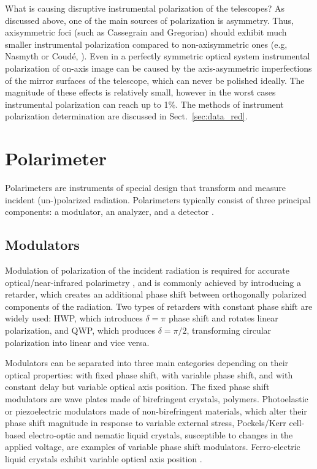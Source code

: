 What is causing disruptive instrumental polarization of the telescopes? 
As discussed above, one of the main sources of polarization is asymmetry.
Thus, axisymmetric foci (such as Cassegrain and Gregorian) should exhibit much smaller instrumental polarization compared to non-axisymmetric ones (e.g, Nasmyth or Coud\'{e}, \citealt{Serkowski1974, AstronomicalPolarimetry}).
Even in a perfectly symmetric optical system instrumental polarization of on-axis image can be caused by the axis-asymmetric imperfections of the mirror surfaces of the telescope, which can never be polished ideally. 
The magnitude of these effects is relatively small, however in the worst cases instrumental polarization can reach up to 1\%.
The methods of instrument polarization determination are discussed in Sect.~\ref{sec:data_red}.


\section{Polarimeter}
Polarimeters are instruments of special design that transform and measure incident (un-)polarized radiation.
Polarimeters typically consist of three principal components: a modulator, an analyzer, and a detector \citep{Serkowski1974,AstronomicalPolarimetry,Berdyugin2019}.

\subsection{Modulators}
\label{sec:pol:mods}
Modulation of polarization of the incident radiation is required for accurate optical/near-infrared polarimetry \citep{Serkowski1974,AstronomicalPolarimetry}, and is commonly achieved by introducing a retarder, which creates an additional phase shift between orthogonally polarized components of the radiation.
Two types of retarders with constant phase shift are widely used: \gls{HWP}, which introduces $\delta = \pi$ phase shift and rotates linear polarization, and \gls{QWP}, which produces $\delta = \pi/2$, transforming circular polarization into linear and vice versa.

Modulators can be separated into three main categories depending on their optical properties: with fixed phase shift, with variable phase shift, and with constant delay but variable optical axis position.
The fixed phase shift modulators are wave plates made of birefringent crystals, polymers.
Photoelastic or piezoelectric modulators made of non-birefringent materials, which alter their phase shift magnitude in response to variable external stress, Pockels/Kerr cell-based electro-optic and nematic liquid crystals, susceptible to changes in the applied voltage, are examples of variable phase shift modulators.
Ferro-electric liquid crystals exhibit variable optical axis position \citep{Berdyugin2019}.


